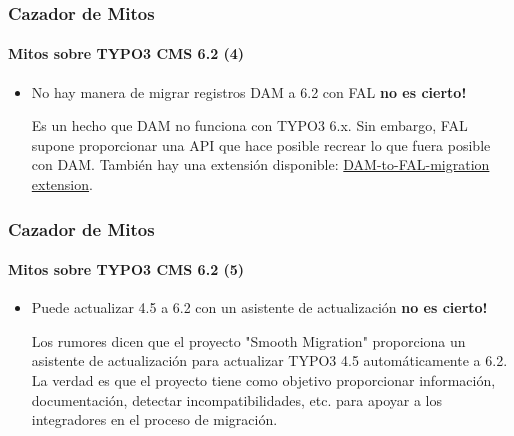 
\begin{frame}[fragile]
	\frametitle{Cazador de Mitos}
	\framesubtitle{Mitos sobre TYPO3 CMS 6.2 (4)}

	\begin{itemize}
		\item No hay manera de migrar registros DAM a 6.2 con FAL\newline
			\tabto{8.4cm}\color{red}\textbf{\textrightarrow no es cierto!}\color{black}

			\smaller
				Es un hecho que DAM no funciona con TYPO3 6.x. Sin embargo, FAL supone proporcionar una API que hace posible recrear lo que fuera posible con DAM. También hay una extensión disponible: \href{https://github.com/fnagel/t3ext-dam_falmigration}{DAM-to-FAL-migration extension}.
	\end{itemize}

\end{frame}


\begin{frame}[fragile]
	\frametitle{Cazador de Mitos}
	\framesubtitle{Mitos sobre TYPO3 CMS 6.2 (5)}

	\begin{itemize}
		\item Puede actualizar 4.5 a 6.2 con un asistente de actualización\newline
			\tabto{8.4cm}\color{red}\textbf{\textrightarrow no es cierto!}\color{black}

			\smaller
				Los rumores dicen que el proyecto "Smooth Migration" proporciona un asistente de actualización para actualizar TYPO3 4.5 automáticamente a 6.2. La verdad es que el proyecto tiene como objetivo proporcionar información, documentación, detectar incompatibilidades, etc. para apoyar a los integradores en el proceso de migración.
	\end{itemize}

\end{frame}



